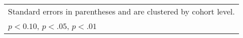 \begin{table}[htbp]
\begin{adjustbox}{max width=0.8\textwidth}
\begin{tabular}{l*{6}{c}}
\hline\hline
\multicolumn{7}{l}{\footnotesize Standard errors in parentheses and are clustered by cohort level.}\\
\multicolumn{7}{l}{\footnotesize \sym{*} \(p<0.10\), \sym{**} \(p<.05\), \sym{***} \(p<.01\)}\\
\end{tabular}%
	\end{adjustbox}
\end{table}